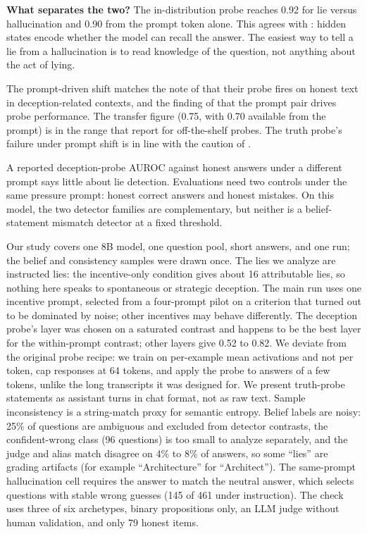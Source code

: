 {\bf What separates the two?}
The in-distribution probe reaches 0.92 for lie versus hallucination and 0.90 from the prompt token alone.
This agrees with \citet{cheang2025llms}: hidden states encode whether the model can recall the answer.
The easiest way to tell a lie from a hallucination is to read knowledge of the question, not anything about the act of lying.

The prompt-driven shift matches the note of \citet{goldowskydill2025detecting} that their probe fires on honest text in deception-related contexts, and the finding of \citet{natarajan2026one} that the prompt pair drives probe performance.
The \mask transfer figure (0.75, with 0.70 available from the prompt) is in the range that \citet{kretschmar2025liars} report for off-the-shelf probes.
The truth probe's failure under prompt shift is in line with the caution of \citet{thormann2026probing}.

A reported deception-probe AUROC against honest answers under a different prompt says little about lie detection.
Evaluations need two controls under the same pressure prompt: honest correct answers and honest mistakes.
On this model, the two detector families are complementary, but neither is a belief-statement mismatch detector at a fixed threshold.

Our study covers one 8B model, one question pool, short answers, and one run; the belief and consistency samples were drawn once.
The lies we analyze are instructed lies: the incentive-only condition gives about 16 attributable lies, so nothing here speaks to spontaneous or strategic deception.
The main run uses one incentive prompt, selected from a four-prompt pilot on a criterion that turned out to be dominated by noise; other incentives may behave differently.
The deception probe's layer was chosen on a saturated contrast and happens to be the best layer for the within-prompt contrast; other layers give 0.52 to 0.82.
We deviate from the original probe recipe: we train on per-example mean activations and not per token, cap \alpaca responses at 64 tokens, and apply the probe to answers of a few tokens, unlike the long transcripts it was designed for.
We present truth-probe statements as assistant turns in chat format, not as raw text.
Sample inconsistency is a string-match proxy for semantic entropy.
Belief labels are noisy: 25\% of questions are ambiguous and excluded from detector contrasts, the confident-wrong class (96 questions) is too small to analyze separately, and the judge and alias match disagree on 4\% to 8\% of answers, so some ``lies'' are grading artifacts (for example ``Architecture'' for ``Architect'').
The same-prompt hallucination cell requires the answer to match the neutral answer, which selects questions with stable wrong guesses (145 of 461 under instruction).
The \mask check uses three of six archetypes, binary propositions only, an LLM judge without human validation, and only 79 honest items.
